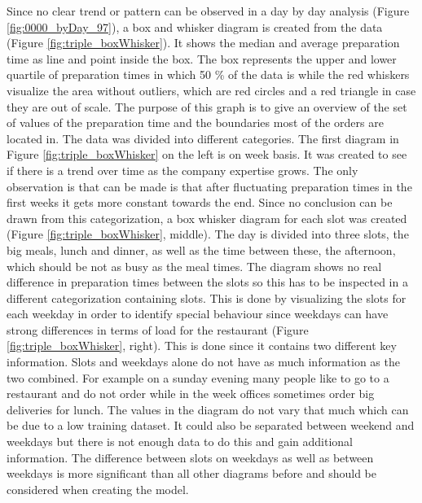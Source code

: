 Since no clear trend or pattern can be observed in a day by day analysis (Figure \ref{fig:0000_byDay_97}), a box and whisker diagram is created from the data (Figure \ref{fig:triple_boxWhisker}). It shows the median and average preparation time as line and point inside the box. The box represents the upper and lower quartile of preparation times in which 50 \% of the data is while the red whiskers visualize the area without outliers, which are red circles and a red triangle in case they are out of scale. The purpose of this graph is to give an overview of the set of values of the preparation time and the boundaries most of the orders are located in. The data was divided into different categories.\newline
The first diagram in Figure \ref{fig:triple_boxWhisker} on the left is on week basis. It was created to see if there is a trend over time as the company expertise grows. The only observation is that can be made is that after fluctuating preparation times in the first weeks it gets more constant towards the end.\newline
Since no conclusion can be drawn from this categorization, a box whisker diagram for each slot was created (Figure \ref{fig:triple_boxWhisker}, middle). The day is divided into three slots, the big meals, lunch and dinner, as well as the time between these, the afternoon, which should be not as busy as the meal times. The diagram shows no real difference in preparation times between the slots so this has to be inspected in a different categorization containing slots.\newline
This is done by visualizing the slots for each weekday in order to identify special behaviour since weekdays can have strong differences in terms of load for the restaurant (Figure \ref{fig:triple_boxWhisker}, right). This is done since it contains two different key information. Slots and weekdays alone do not have as much information as the two combined. For example on a sunday evening many people like to go to a restaurant and do not order while in the week offices sometimes order big deliveries for lunch. The values in the diagram do not vary that much which can be due to a low training dataset. It could also be separated between weekend and weekdays but there is not enough data to do this and gain additional information.\newline
The difference between slots on weekdays as well as between weekdays is more significant than all other diagrams before and should be considered when creating the model.

